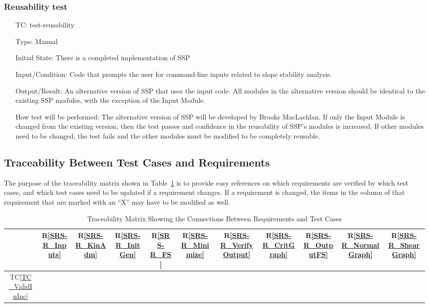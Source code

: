 \documentclass[12pt, titlepage]{article}
\newcommand{\rref}[1]{R\ref{#1}}
\newcounter{testnum} %
\newcommand{\tcref}[1]{TC\ref{#1}}
\newcommand{\progname}{SSP}
\begin{document}
\subsubsection{Reusability test}

\begin{enumerate}[label=TC\arabic*:,ref={\arabic*}]
	
\item [TC\refstepcounter{testnum}\thetestnum: \label{TC_Reusability}] 
test-reusability

Type: Manual

Initial State: There is a completed implementation of \progname{}
	
Input/Condition: Code that prompts the user for command-line inputs related to 
slope stability analysis.

Output/Result: An alternative version of \progname{} that uses the input code. 
All modules in the alternative version should be identical to the existing 
\progname{} modules, with the exception of the Input Module.

How test will be performed: The alternative version of \progname{} will be 
developed by Brooks MacLachlan. If only the Input Module is changed from the 
existing version, then the test passes and confidence in the reusability of 
\progname{}'s modules is increased. If other modules need to be changed, the 
test fails and the other modules must be modified to be completely reusable.
	
\end{enumerate}

\subsection{Traceability Between Test Cases and Requirements}

\noindent The purpose of the traceability matrix shown in 
Table~\ref{Table:T_trace} is to provide easy 
references on which requirements are verified by which test cases, and which 
test cases need to be updated if a requirement changes.  If a requirement is 
changed, the items in the column of that requirement that are marked
with an ``X'' may have to be modified as well. 

\begin{table}[!h]
	\centering
	\begin{tabular}{|c|c|c|c|c|c|c|c|c|c|c|}
		\hline
		& \rref{SRS-R_Inputs}& \rref{SRS-R_KinAdm}& \rref{SRS-R_InitGen}& 
		\rref{SRS-R_FS}& \rref{SRS-R_Minimize} & \rref{SRS-R_VerifyOutput}& 
		\rref{SRS-R_CritGraph}& \rref{SRS-R_OutputFS}& 
		\rref{SRS-R_NormalGraph}& \rref{SRS-R_ShearGraph} \\
		\hline
		\tcref{TC_ValidInInc}       & & & & & & & & & & \\ \hline
		\hline
	\end{tabular}
	\caption{Traceability Matrix Showing the Connections Between Requirements 
	and Test Cases}
	\label{Table:T_trace}
\end{table}
\end{document}

